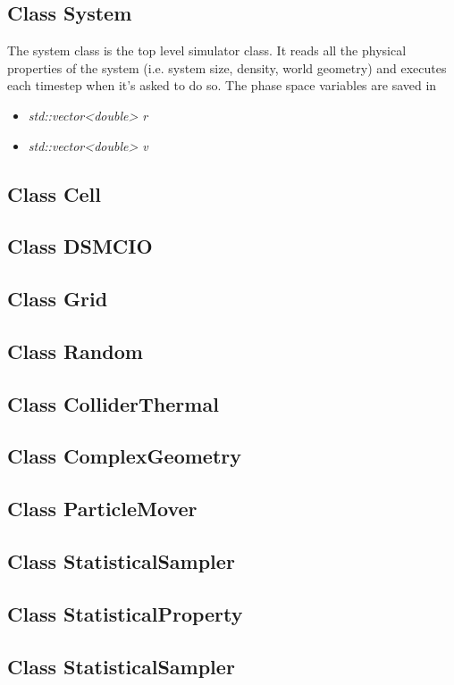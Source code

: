 \subsection{Class System}
The system class is the top level simulator class. It reads all the physical properties of the system (i.e. system size, density, world geometry) and executes each timestep when it's asked to do so. The phase space variables are saved in 
\begin{itemize}
\item \textit{std::vector<double> r}
\item \textit{std::vector<double> v}
\end{itemize}

\subsection{Class Cell}
\subsection{Class DSMCIO}
\subsection{Class Grid}
\subsection{Class Random}
\subsection{Class ColliderThermal}
\subsection{Class ComplexGeometry}
\subsection{Class ParticleMover}
\subsection{Class StatisticalSampler}
\subsection{Class StatisticalProperty}
\subsection{Class StatisticalSampler}
